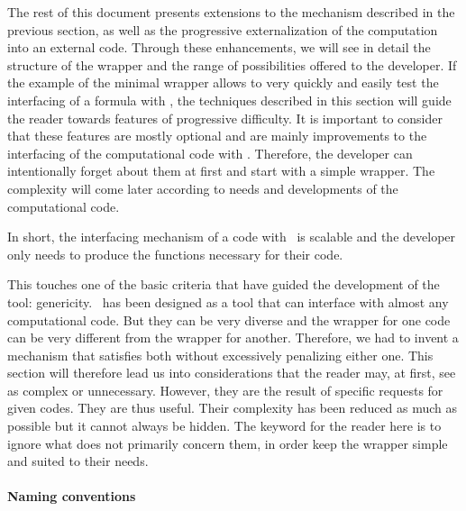 
The rest of this document presents extensions to the mechanism described in the previous section, as well as the progressive externalization of the computation into an external code. Through these enhancements, we will see in detail the structure of the wrapper and the range of possibilities offered to the developer. If the example of the minimal wrapper allows to very quickly and easily test the interfacing of a formula with \OT , the techniques described in this section will guide the reader towards features of progressive difficulty. It is important to consider that these features are mostly optional and are mainly improvements to the interfacing of the computational code with \OT . Therefore, the developer can intentionally forget about them at first and start with a simple wrapper. The complexity will come later according to needs and developments of the computational code.

In short, the interfacing mechanism of a code with \OT\ is scalable and the developer only needs to produce the functions necessary for their code.

This touches one of the basic criteria that have guided the development of the tool: genericity. \OT\ has been designed as a tool that can interface with almost any computational code. But they can be very diverse and the wrapper for one code can be very different from the wrapper for another. Therefore, we had to invent a mechanism that satisfies both without excessively penalizing either one. This section will therefore lead us into considerations that the reader may, at first, see as complex or unnecessary. However, they are the result of specific requests for given codes. They are thus useful. Their complexity has been reduced as much as possible but it cannot always be hidden. The keyword for the reader here is to ignore what does not primarily concern them, in order keep the wrapper simple and suited to their needs.

\paragraph{Naming conventions}

